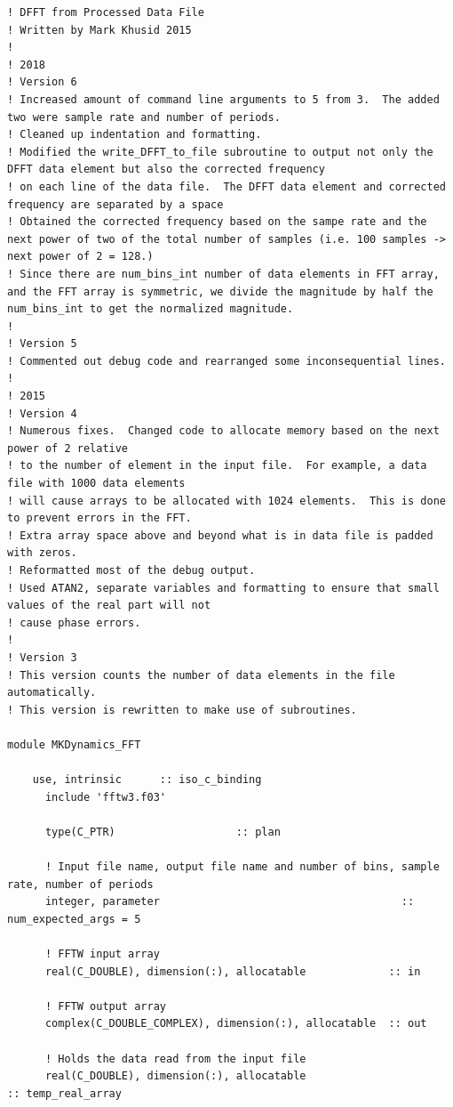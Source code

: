 \begin{verbatim}
! DFFT from Processed Data File
! Written by Mark Khusid 2015
!
! 2018
! Version 6
! Increased amount of command line arguments to 5 from 3.  The added two were sample rate and number of periods.
! Cleaned up indentation and formatting.
! Modified the write_DFFT_to_file subroutine to output not only the DFFT data element but also the corrected frequency
! on each line of the data file.  The DFFT data element and corrected frequency are separated by a space
! Obtained the corrected frequency based on the sampe rate and the next power of two of the total number of samples (i.e. 100 samples -> next power of 2 = 128.)
! Since there are num_bins_int number of data elements in FFT array, and the FFT array is symmetric, we divide the magnitude by half the num_bins_int to get the normalized magnitude.
!
! Version 5
! Commented out debug code and rearranged some inconsequential lines.
!
! 2015
! Version 4
! Numerous fixes.  Changed code to allocate memory based on the next power of 2 relative
! to the number of element in the input file.  For example, a data file with 1000 data elements
! will cause arrays to be allocated with 1024 elements.  This is done to prevent errors in the FFT.
! Extra array space above and beyond what is in data file is padded with zeros.
! Reformatted most of the debug output.
! Used ATAN2, separate variables and formatting to ensure that small values of the real part will not 
! cause phase errors.
!
! Version 3
! This version counts the number of data elements in the file automatically.
! This version is rewritten to make use of subroutines.

module MKDynamics_FFT

    use, intrinsic      :: iso_c_binding
      include 'fftw3.f03'
      
      type(C_PTR)         			:: plan
      
      ! Input file name, output file name and number of bins, sample rate, number of periods
      integer, parameter                                      :: num_expected_args = 5
      
      ! FFTW input array
      real(C_DOUBLE), dimension(:), allocatable			    :: in
      
      ! FFTW output array
      complex(C_DOUBLE_COMPLEX), dimension(:), allocatable	:: out
      
      ! Holds the data read from the input file
      real(C_DOUBLE), dimension(:), allocatable   			                :: temp_real_array
      

\end{verbatim}
